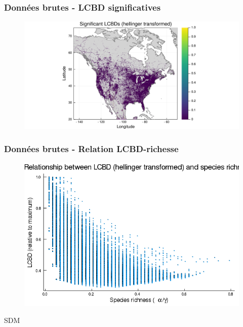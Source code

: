 \documentclass[10pt]{beamer}
\begin{document}
\begin{frame}
  \frametitle{Données brutes - LCBD significatives}
  \begin{figure}
    \centering
    \hspace*{-2cm}\includegraphics[scale=0.5]{../fig/raw/raw-lcbd-signif.pdf}
  \end{figure}
\end{frame}

\begin{frame}
  \frametitle{Données brutes - Relation LCBD-richesse}
  \begin{figure}
    \centering
    \includegraphics[scale=0.4]{../fig/raw/raw-relation-lcbd-richness-transf.png}
  \end{figure}
\end{frame}



\begin{frame}
  \vfill
  \centering
  \huge SDM
  \vfill
\end{frame}
\end{document}
